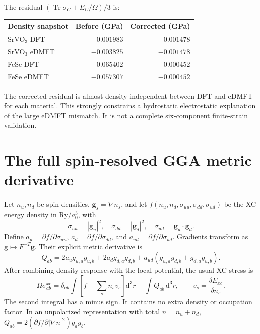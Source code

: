 \documentclass[11pt]{article}
\newcommand{\Tr}{\operatorname{Tr}}
\newcommand{\dd}{\mathrm d}
\begin{document}
The residual $(\Tr\sigma_C+E_C/\Omega)/3$ is:
\begin{center}
\begin{tabular}{lrr}\toprule
Density snapshot & Before (GPa) & Corrected (GPa)\\\midrule
SrVO$_3$ DFT & $-0.001983$ & $-0.001478$\\
SrVO$_3$ eDMFT & $-0.003825$ & $-0.001478$\\
FeSe DFT & $-0.065402$ & $-0.000452$\\
FeSe eDMFT & $-0.057307$ & $-0.000452$\\\bottomrule
\end{tabular}
\end{center}
The corrected residual is almost density-independent between DFT and eDMFT for each material. This strongly constrains a hydrostatic electrostatic explanation of the large eDMFT mismatch. It is not a complete six-component finite-strain validation.

\section{The full spin-resolved GGA metric derivative}
Let $n_u,n_d$ be spin densities, $\bm g_s=\nabla n_s$, and let $f(n_u,n_d,\sigma_{uu},\sigma_{dd},\sigma_{ud})$ be the XC energy density in Ry/$a_0^3$, with
\begin{equation}
 \sigma_{uu}=|\bm g_u|^2,\quad \sigma_{dd}=|\bm g_d|^2,\quad
 \sigma_{ud}=\bm g_u\cdot\bm g_d.
\end{equation}
Define $a_u=\partial f/\partial\sigma_{uu}$, $a_d=\partial f/\partial\sigma_{dd}$, and $a_{ud}=\partial f/\partial\sigma_{ud}$. Gradients transform as $\bm g\mapsto F^{-T}\bm g$. Their explicit metric derivative is
\begin{equation}\label{eq:gga}
 \boxed{Q_{ab}=2a_u g_{u,a}g_{u,b}+2a_d g_{d,a}g_{d,b}
       +a_{ud}(g_{u,a}g_{d,b}+g_{d,a}g_{u,b}).}
\end{equation}
After combining density response with the local potential, the usual XC stress is
\begin{equation}\label{eq:xctotal}
 \Omega\sigma^{xc}_{ab}=\delta_{ab}\int\left[f-\sum_s n_sv_s\right]\dd^3r
 -\int Q_{ab}\,\dd^3r,
 \qquad v_s=\frac{\delta E_{xc}}{\delta n_s}.
\end{equation}
The second integral has a minus sign. It contains no extra density or occupation factor. In an unpolarized representation with total $n=n_u+n_d$, $Q_{ab}=2(\partial f/\partial|\nabla n|^2)g_ag_b$.
\end{document}
